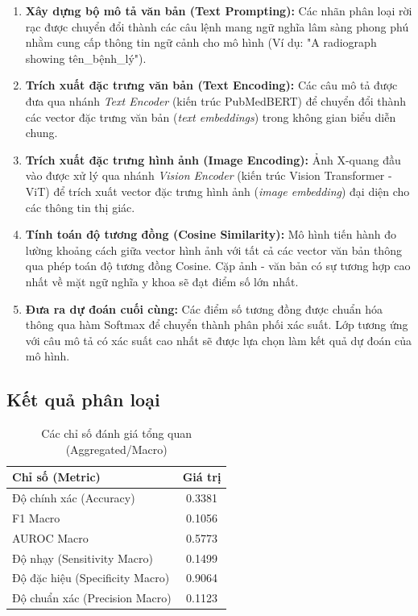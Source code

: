 \begin{enumerate}
    \item \textbf{Xây dựng bộ mô tả văn bản (Text Prompting):} Các nhãn phân loại rời rạc được chuyển đổi thành các câu lệnh mang ngữ nghĩa lâm sàng phong phú nhằm cung cấp thông tin ngữ cảnh cho mô hình (Ví dụ: "A radiograph showing {tên\_bệnh\_lý}").
    \item \textbf{Trích xuất đặc trưng văn bản (Text Encoding):} Các câu mô tả được đưa qua nhánh \textit{Text Encoder} (kiến trúc PubMedBERT) để chuyển đổi thành các vector đặc trưng văn bản (\textit{text embeddings}) trong không gian biểu diễn chung.
    \item \textbf{Trích xuất đặc trưng hình ảnh (Image Encoding):} Ảnh X-quang đầu vào được xử lý qua nhánh \textit{Vision Encoder} (kiến trúc Vision Transformer - ViT) để trích xuất vector đặc trưng hình ảnh (\textit{image embedding}) đại diện cho các thông tin thị giác.
    \item \textbf{Tính toán độ tương đồng (Cosine Similarity):} Mô hình tiến hành đo lường khoảng cách giữa vector hình ảnh với tất cả các vector văn bản thông qua phép toán độ tương đồng Cosine. Cặp ảnh - văn bản có sự tương hợp cao nhất về mặt ngữ nghĩa y khoa sẽ đạt điểm số lớn nhất.
    \item \textbf{Đưa ra dự đoán cuối cùng:} Các điểm số tương đồng được chuẩn hóa thông qua hàm Softmax để chuyển thành phân phối xác suất. Lớp tương ứng với câu mô tả có xác suất cao nhất sẽ được lựa chọn làm kết quả dự đoán của mô hình.
\end{enumerate}

\subsection{Kết quả phân loại}

\begin{table}[htbp]
\centering
\caption{Các chỉ số đánh giá tổng quan (Aggregated/Macro)}
\label{tab:macro_metrics}
\begin{tabular}{|l|c|}
\hline
\textbf{Chỉ số (Metric)} & \textbf{Giá trị} \\
\hline
Độ chính xác (Accuracy) & 0.3381 \\
F1 Macro & 0.1056 \\
AUROC Macro & 0.5773 \\
Độ nhạy (Sensitivity Macro) & 0.1499 \\
Độ đặc hiệu (Specificity Macro) & 0.9064 \\
Độ chuẩn xác (Precision Macro) & 0.1123 \\
\hline
\end{tabular}
\end{table}


